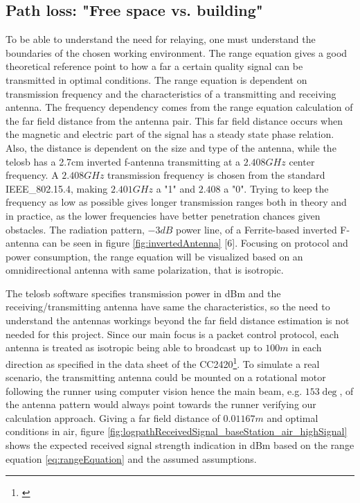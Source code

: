 \subsection{Path loss: "Free space vs. building"}\label{sc:pathLoss}

To be able to understand the need for relaying, one must understand the boundaries of the chosen working environment. The range equation gives a good theoretical reference point to how a far a certain quality signal can be transmitted in optimal conditions. The range equation is dependent on transmission frequency and the characteristics of a transmitting and receiving antenna. The frequency dependency comes from the range equation calculation of the far field distance from the antenna pair. This far field distance occurs when the magnetic and electric part of the signal has a steady state phase relation. Also, the distance is dependent on the size and type of the antenna, while the telosb has a 2.7cm inverted f-antenna transmitting at a $2.408GHz$ center frequency. A $2.408GHz$ transmission frequency is chosen from the standard IEEE\_802.15.4, making $2.401GHz$ a "1" and $2.408$ a "0". Trying to keep the frequency as low as possible gives longer transmission ranges both in theory and in practice, as the lower frequencies have better penetration chances given obstacles. The radiation pattern, $-3dB$ power line, of a Ferrite-based inverted F-antenna can be seen in figure \ref{fig:invertedAntenna} [6]. Focusing on protocol and power consumption, the range equation will be visualized based on an omnidirectional antenna with same polarization, that is isotropic.

\noindent The telosb software specifies transmission power in dBm and the receiving/transmitting antenna have same the characteristics, so the need to understand the antennas workings beyond the far field distance estimation is not needed for this project. Since our main focus is a packet control protocol, each antenna is treated as isotropic being able to broadcast up to $100m$ in each direction as specified in the data sheet of the CC2420\footnote{\cite{Ieee}}. To simulate a real scenario, the transmitting antenna could be mounted on a rotational motor following the runner using computer vision hence the main beam, e.g. $153\deg$, of the antenna pattern would always point towards the runner verifying our calculation approach. Giving a far field distance of $0.01167m$ and optimal conditions in air, figure \ref{fig:logpathReceivedSignal_baseStation_air_highSignal} shows the expected received signal strength indication in dBm based on the range equation \ref{eq:rangeEquation} and the assumed assumptions.

